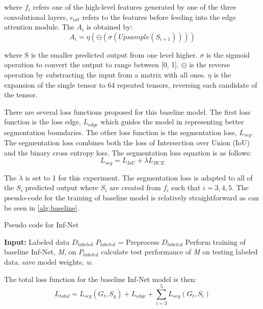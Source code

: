 where $f_i$ refers one of the high-level features generated by one of the three convolutional layers, $e_{att}$ refers to the features before feeding into the edge attention module. The ${A_i}$ is obtained by:
\begin{equation}
A_i = \eta (\circleddash (\sigma (Upsample(S_{i+1}))))
\end{equation}

where S is the smaller predicted output from one level higher. $\sigma$ is the sigmoid operation to convert the output to range between [0, 1]. $\circleddash$ is the reverse operation by substracting the input from a matrix with all ones. $\eta$ is the expansion of the single tensor to 64 repeated tensors, reversing each candidate of the tensor.

There are several loss functions proposed for this baseline model. The first loss function is the loss edge, $L_{edge}$ which guides the model in representing better segmentation boundaries. The other loss function is the segmentation loss, ${L_{seg}}$. The segmentation loss combines both the loss of Intersection over Union (IoU) and the binary cross entropy loss. The segmentation loss equation is as follows:
\begin{equation}
L_{seg} = L_{IoU} + \lambda L_{BCE}
\end{equation}

The $\lambda$ is set to 1 for this experiment. The segmentation loss is adapted to all of the ${S_i}$ predicted output where ${S_i}$ are created from $f_i$ such that $i={3,4,5}$. The pseudo-code for the training of baseline model is relatively straightforward as can be seen in \ref{alg:baseline}.
\begin{algorithm}
	\caption{Pseudo code for Inf-Net}
	\label{alg:baseline}
\begin{algorithmic}
\STATE \textbf{Input:} Labeled data $D_{labeled}$
\STATE $P_{labeled}$ = Preprocess $D_{labeled}$
\STATE Perform training of baseline Inf-Net, \textit{M}, on $P_{labeled}$
\STATE calculate test performance of \textit{M} on testing labeled data.
\STATE save model weights, \textit{w}.
\ENDFOR
\end{algorithmic}
\end{algorithm}

The total loss function for the baseline Inf-Net model is then:
\begin{equation}
L_{total} = L_{seg}(G_t, S_g) + L_{edge} + 	\sum_{i=3}^{5}L_{seg}(G_t, S_i)
\end{equation}

